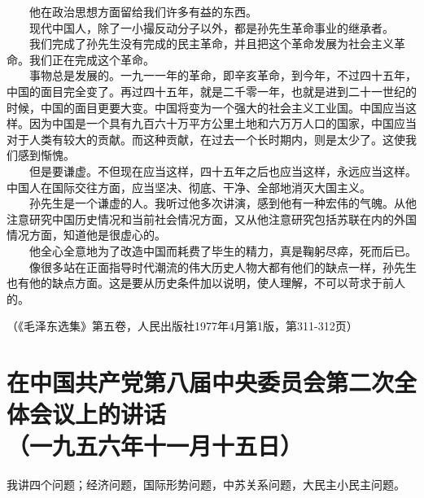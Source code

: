 \documentclass[cn,11pt,chinese]{elegantbook}
\def\myformat#1{\hfil\hfil #1}
\begin{document}
　　他在政治思想方面留给我们许多有益的东西。\\
　　现代中国人，除了一小撮反动分子以外，都是孙先生革命事业的继承者。\\
　　我们完成了孙先生没有完成的民主革命，并且把这个革命发展为社会主义革命。我们正在完成这个革命。\\
　　事物总是发展的。一九一一年的革命，即辛亥革命，到今年，不过四十五年，中国的面目完全变了。再过四十五年，就是二千零一年，也就是进到二十一世纪的时候，中国的面目更要大变。中国将变为一个强大的社会主义工业国。中国应当这样。因为中国是一个具有九百六十万平方公里土地和六万万人口的国家，中国应当对于人类有较大的贡献。而这种贡献，在过去一个长时期内，则是太少了。这使我们感到惭愧。\\
　　但是要谦虚。不但现在应当这样，四十五年之后也应当这样，永远应当这样。中国人在国际交往方面，应当坚决、彻底、干净、全部地消灭大国主义。\\
　　孙先生是一个谦虚的人。我听过他多次讲演，感到他有一种宏伟的气魄。从他注意研究中国历史情况和当前社会情况方面，又从他注意研究包括苏联在内的外国情况方面，知道他是很虚心的。\\
　　他全心全意地为了改造中国而耗费了毕生的精力，真是鞠躬尽瘁，死而后已。\\
　　像很多站在正面指导时代潮流的伟大历史人物大都有他们的缺点一样，孙先生也有他的缺点方面。这是要从历史条件加以说明，使人理解，不可以苛求于前人的。\\
\begin{flushright}（《毛泽东选集》第五卷，人民出版社1977年4月第1版，第311-312页）\end{flushright}
\newpage\section*{\myformat{在中国共产党第八届中央委员会第二次全体会议上的讲话}\\\myformat{（一九五六年十一月十五日）}}
我讲四个问题；经济问题，国际形势问题，中苏关系问题，大民主小民主问题。\\
\end{document}
